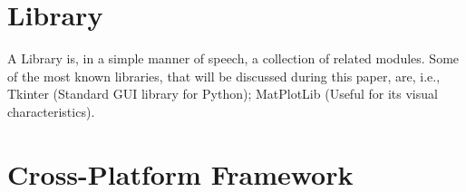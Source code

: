 \newpage

\section*{Library} 
\label{sub:library}



A Library is, in a simple manner of speech, a collection of related modules.
Some of the most known libraries, that will be discussed during this paper, are, i.e., Tkinter (Standard GUI library for Python); MatPlotLib (Useful for its visual characteristics). 








\section*{Cross-Platform Framework} 
\label{sub:cp_framework}

